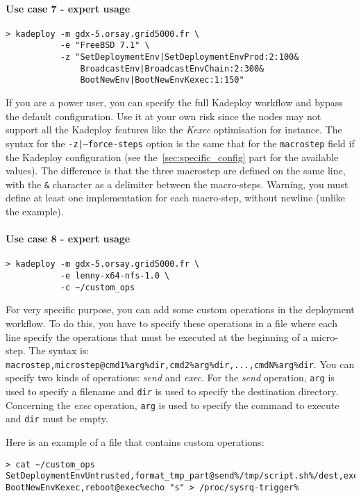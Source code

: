 \documentclass[a4wide,10pt,oneside]{book}
\begin{document}
\paragraph{Use case 7 - expert usage}
\begin{verbatim}
> kadeploy -m gdx-5.orsay.grid5000.fr \
           -e "FreeBSD 7.1" \
           -z "SetDeploymentEnv|SetDeploymentEnvProd:2:100&
               BroadcastEnv|BroadcastEnvChain:2:300&
               BootNewEnv|BootNewEnvKexec:1:150"
\end{verbatim}
If you are a power user, you can specify the full Kadeploy workflow and bypass the default configuration. Use it at your own risk since the nodes may not support all the Kadeploy features like the \textit{Kexec} optimisation for instance. The syntax for the \texttt{-z|--force-steps} option is the same that for the \texttt{macrostep} field if the Kadeploy configuration (see the~\ref{sec:specific_config} part for the available values). The difference is that the three macrostep are defined on the same line, with the \texttt{\&} character as a delimiter between the macro-steps. Warning, you must define at least one implementation for each macro-step, without newline (unlike the example).

\paragraph{Use case 8 - expert usage}
\begin{verbatim}
> kadeploy -m gdx-5.orsay.grid5000.fr \
           -e lenny-x64-nfs-1.0 \
           -c ~/custom_ops
\end{verbatim}
For very specific purpose, you can add some custom operations in the deployment workflow. To do this, you have to specify these operations in a file where each line specify the operations that must be executed at the beginning of a micro-step. The syntax is: \texttt{macrostep,microstep@cmd1\%arg\%dir,cmd2\%arg\%dir,...,cmdN\%arg\%dir}. You can specify two kinds of operations: \textit{send} and \textit{exec}. For the \textit{send} operation, \texttt{arg} is used to specify a filename and \texttt{dir} is used to specify the destination directory. Concerning the \textit{exec} operation, \texttt{arg} is used to specify the command to execute and \texttt{dir} must be empty.

Here is an example of a file that contains custom operations:
\begin{small}
\begin{verbatim}
> cat ~/custom_ops
SetDeploymentEnvUntrusted,format_tmp_part@send%/tmp/script.sh%/dest,exec%/dest/script.sh%
BootNewEnvKexec,reboot@exec%echo "s" > /proc/sysrq-trigger%
\end{verbatim}
\end{small}
\end{document}
